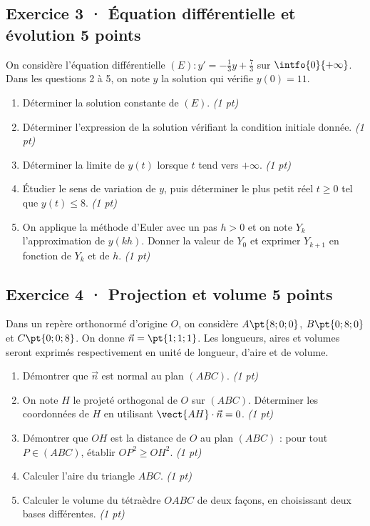\mxnewpage{}

\subsection*{Exercice 3 · Équation différentielle et évolution \hfill 5 points}On considère l'équation différentielle $(E):y'=-\frac1{3}y+\frac{7}{3}$ sur $\intfo{0}{+\infty}$. Dans les questions 2 à 5, on note $y$ la solution qui vérifie $y(0)=11$.

\begin{enumerate}

\item Déterminer la solution constante de $(E)$. \hfill\textit{(1 pt)}

\item Déterminer l'expression de la solution vérifiant la condition initiale donnée. \hfill\textit{(1 pt)}

\item Déterminer la limite de $y(t)$ lorsque $t$ tend vers $+\infty$. \hfill\textit{(1 pt)}

\item Étudier le sens de variation de $y$, puis déterminer le plus petit réel $t\ge0$ tel que $y(t)\le8$. \hfill\textit{(1 pt)}

\item On applique la méthode d'Euler avec un pas $h>0$ et on note $Y_k$ l'approximation de $y(kh)$. Donner la valeur de $Y_0$ et exprimer $Y_{k+1}$ en fonction de $Y_k$ et de $h$. \hfill\textit{(1 pt)}

\end{enumerate}

\subsection*{Exercice 4 · Projection et volume \hfill 5 points}Dans un repère orthonormé d'origine $O$, on considère $A\pt{8;0;0}$, $B\pt{0;8;0}$ et $C\pt{0;0;8}$. On donne $\vec n=\pt{1;1;1}$. Les longueurs, aires et volumes seront exprimés respectivement en unité de longueur, d'aire et de volume.

\begin{enumerate}

\item Démontrer que $\vec n$ est normal au plan $(ABC)$. \hfill\textit{(1 pt)}

\item On note $H$ le projeté orthogonal de $O$ sur $(ABC)$. Déterminer les coordonnées de $H$ en utilisant $\vect{AH}\cdot\vec n=0$. \hfill\textit{(1 pt)}

\item Démontrer que $OH$ est la distance de $O$ au plan $(ABC)$ : pour tout $P\in(ABC)$, établir $OP^2\ge OH^2$. \hfill\textit{(1 pt)}

\item Calculer l'aire du triangle $ABC$. \hfill\textit{(1 pt)}

\item Calculer le volume du tétraèdre $OABC$ de deux façons, en choisissant deux bases différentes. \hfill\textit{(1 pt)}

\end{enumerate}

